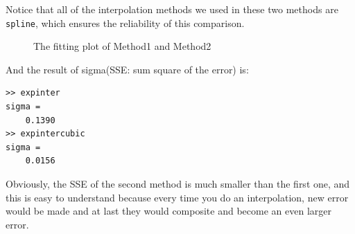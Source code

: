 \documentclass[a4paper]{article}
\begin{document}
Notice that all of the interpolation methods we used in these two methods are \verb$spline$, which ensures the reliability of this comparison.
\begin{figure}[H]
\caption{The fitting plot of Method1 and Method2}
\end{figure}

And the result of sigma(SSE: sum square of the error) is:
\begin{verbatim}
>> expinter
sigma =
    0.1390
>> expintercubic
sigma =
    0.0156
\end{verbatim}

Obviously, the SSE of the second method is much smaller than the first one, and this is easy to understand because every time you do an interpolation, new error would be made and at last they would composite and become an even larger error.\\
\end{document}
